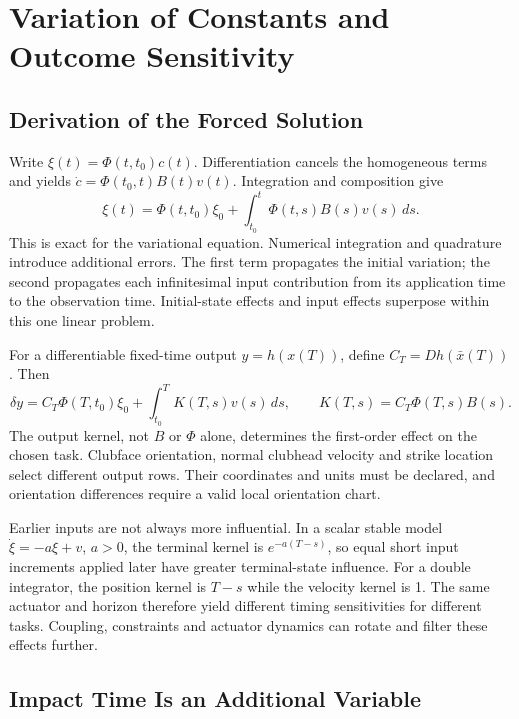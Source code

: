 \section{Variation of Constants and Outcome Sensitivity}

\subsection{Derivation of the Forced Solution}

Write $\xi(t)=\Phi(t,t_0)c(t)$. Differentiation cancels the homogeneous terms and yields $\dot c=\Phi(t_0,t)B(t)v(t)$. Integration and composition give
\begin{equation}
\xi(t)=\Phi(t,t_0)\xi_0+
\int_{t_0}^t\Phi(t,s)B(s)v(s)\,ds.
\label{eq:ch2:duhamel}
\end{equation}
This is exact for the variational equation. Numerical integration and quadrature introduce additional errors. The first term propagates the initial variation; the second propagates each infinitesimal input contribution from its application time to the observation time. Initial-state effects and input effects superpose within this one linear problem.

For a differentiable fixed-time output $y=h(x(T))$, define $C_T=Dh(\bar x(T))$. Then
\begin{equation}
\delta y=C_T\Phi(T,t_0)\xi_0+
\int_{t_0}^T K(T,s)v(s)\,ds,
\qquad K(T,s)=C_T\Phi(T,s)B(s).
\end{equation}
The output kernel, not $B$ or $\Phi$ alone, determines the first-order effect on the chosen task. Clubface orientation, normal clubhead velocity and strike location select different output rows. Their coordinates and units must be declared, and orientation differences require a valid local orientation chart.

Earlier inputs are not always more influential. In a scalar stable model $\dot\xi=-a\xi+v$, $a>0$, the terminal kernel is $e^{-a(T-s)}$, so equal short input increments applied later have greater terminal-state influence. For a double integrator, the position kernel is $T-s$ while the velocity kernel is 1. The same actuator and horizon therefore yield different timing sensitivities for different tasks. Coupling, constraints and actuator dynamics can rotate and filter these effects further.

\subsection{Impact Time Is an Additional Variable}

